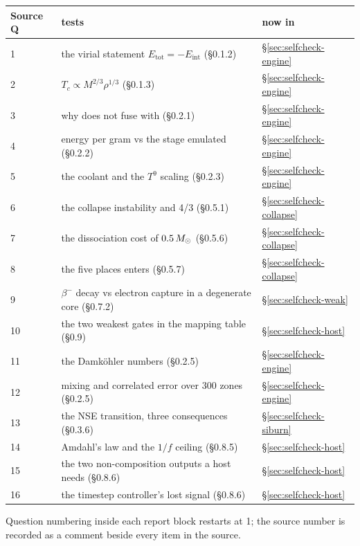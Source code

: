 \begingroup
\small
\begin{tabularx}{\textwidth}{@{}L{1.4cm} Y L{3.6cm}@{}}
\toprule
\textbf{Source Q} & \textbf{tests} & \textbf{now in} \\
 & the virial statement $E_{\mathrm{tot}} = -E_{\mathrm{int}}$ (\S0.1.2) & \S\ref{sec:selfcheck-engine} \\
2 & $T_c \propto M^{2/3}\rho^{1/3}$ (\S0.1.3) & \S\ref{sec:selfcheck-engine} \\
3 & why  does not fuse with  (\S0.2.1) & \S\ref{sec:selfcheck-engine} \\
4 & energy per gram vs the stage emulated (\S0.2.2) & \S\ref{sec:selfcheck-engine} \\
5 & the coolant and the $T^9$ scaling (\S0.2.3) & \S\ref{sec:selfcheck-engine} \\
6 & the collapse instability and 4/3 (\S0.5.1) & \S\ref{sec:selfcheck-collapse} \\
7 & the dissociation cost of $0.5\,M_{\odot}$ (\S0.5.6) & \S\ref{sec:selfcheck-collapse} \\
8 & the five places \Ye{} enters (\S0.5.7) & \S\ref{sec:selfcheck-collapse} \\
9 & $\beta^-$ decay vs electron capture in a degenerate core (\S0.7.2) & \S\ref{sec:selfcheck-weak} \\
10 & the two weakest gates in the mapping table (\S0.9) & \S\ref{sec:selfcheck-host} \\
11 & the Damk\"ohler numbers (\S0.2.5) & \S\ref{sec:selfcheck-engine} \\
12 & mixing and correlated error over 300 zones (\S0.2.5) & \S\ref{sec:selfcheck-engine} \\
13 & the NSE transition, three consequences (\S0.3.6) & \S\ref{sec:selfcheck-siburn} \\
14 & Amdahl's law and the $1/f$ ceiling (\S0.8.5) & \S\ref{sec:selfcheck-host} \\
15 & the two non-composition outputs a host needs (\S0.8.6) & \S\ref{sec:selfcheck-host} \\
16 & the timestep controller's lost signal (\S0.8.6) & \S\ref{sec:selfcheck-host} \\
\bottomrule
\end{tabularx}
\endgroup

Question numbering inside each report block restarts at 1; the source number
is recorded as a comment beside every item in the  source.

